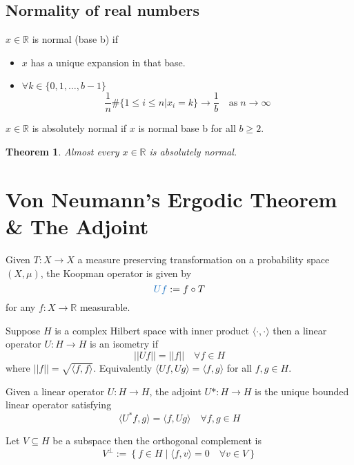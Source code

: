 \documentclass[11pt]{article}
\newcommand{\defeq}{:=}
\newcommand{\norm}[1]{\left|\left|#1\right|\right|}
\newcommand{\relmiddle}[1]{\mathrel{}\middle#1\mathrel{}}
\newcommand{\rmv}{\relmiddle|}
\newcommand{\R}{\mathbb{R}}
\newenvironment{defin}
	{\begin{mdframed}[backgroundcolor=white, roundcorner=5pt, linewidth=1pt, linecolor=RoyalBlue]}
	{\end{mdframed}}
\newcommand{\mdf}[1]{{\color{RoyalBlue} #1}}
\newtheorem{theorem}[prop]{Theorem}
\begin{document}
\subsection{Normality of real numbers}
\begin{defin}
$x\in\R$ is \mdf{normal (base b)} if
\begin{itemize}
	\item $x$ has a  unique expansion in that base.
	\item $\forall k\in\{0,1,\dots,b-1\}$
		$$\frac{1}{n}\#\{1\leq i\leq n | x_i=k\}\to\frac{1}{b}\quad\text{as}\;n\to\infty$$
\end{itemize}

$x\in\R$ is \mdf{absolutely normal} if $x$ is normal base b for all $b\geq 2$.
\end{defin}
\begin{theorem}
Almost every $x\in\R$ is absolutely normal.
\end{theorem}

\section{Von Neumann's Ergodic Theorem \& The Adjoint}

\begin{defin}
	Given $T:X\to X$ a measure preserving transformation on a probability space $(X, \mu)$, the \mdf{Koopman operator} is given by
	\[
		\mdf{Uf}\defeq f\circ T
	\]
	for any $f:X\to \R$ measurable.


	Suppose $H$ is a complex Hilbert space with inner product $\langle\cdot, \cdot\rangle$ then a linear operator $U:H\to H$ is an \mdf{isometry} if
	\[
		\norm{Uf}=\norm{f}\quad\forall f\in H
	\]
	where $\norm{f}=\sqrt{\langle f, f\rangle}$.
	Equivalently $\langle Uf, Ug \rangle= \langle f, g\rangle$ for all $f,g \in H$.

	Given a linear operator $U:H\to H$, the \mdf{adjoint} $U*:H\to H$ is the unique bounded linear operator satisfying
	\[
\langle U^\ast f, g \rangle= \langle f, Ug \rangle \quad \forall f, g \in H
	\]

	Let $V\subseteq H$ be a subspace then the \mdf{orthogonal complement} is
	\[
		V^\perp \defeq \left\{ f\in H \rmv \langle f, v \rangle =0 \quad \forall v \in V\right\}
	\]
\end{defin}
\end{document}
